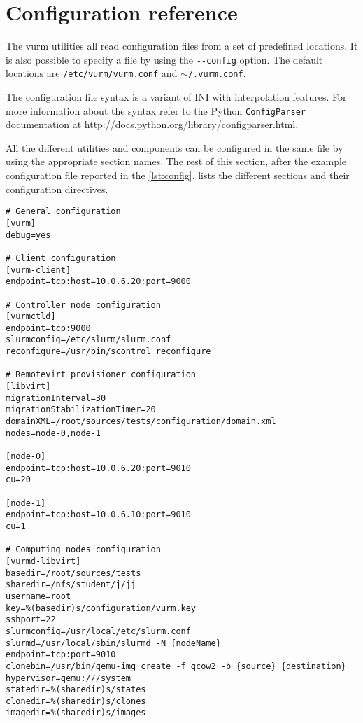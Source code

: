 \section{Configuration reference}

The \gls{vurm} utilities all read configuration files from a set of predefined locations. It is also possible to specify a file by using the \texttt{-\--config} option. The default locations are \texttt{/etc/vurm/vurm.conf} and \texttt{$\sim$/.vurm.conf}.

The configuration file syntax is a variant of INI with interpolation features. For more information about the syntax refer to the Python \texttt{ConfigParser} documentation at \url{http://docs.python.org/library/configparser.html}.

All the different utilities and components can be configured in the same file by using the appropriate section names. The rest of this section, after the example configuration file reported in the \autoref{lst:config}, lists the different sections and their configuration directives.

\begin{lstlisting}
# General configuration
[vurm]
debug=yes

# Client configuration
[vurm-client]
endpoint=tcp:host=10.0.6.20:port=9000

# Controller node configuration
[vurmctld]
endpoint=tcp:9000
slurmconfig=/etc/slurm/slurm.conf
reconfigure=/usr/bin/scontrol reconfigure

# Remotevirt provisioner configuration
[libvirt]
migrationInterval=30
migrationStabilizationTimer=20
domainXML=/root/sources/tests/configuration/domain.xml
nodes=node-0,node-1

[node-0]
endpoint=tcp:host=10.0.6.20:port=9010
cu=20

[node-1]
endpoint=tcp:host=10.0.6.10:port=9010
cu=1

# Computing nodes configuration
[vurmd-libvirt]
basedir=/root/sources/tests
sharedir=/nfs/student/j/jj
username=root
key=%(basedir)s/configuration/vurm.key
sshport=22
slurmconfig=/usr/local/etc/slurm.conf
slurmd=/usr/local/sbin/slurmd -N {nodeName}
endpoint=tcp:port=9010
clonebin=/usr/bin/qemu-img create -f qcow2 -b {source} {destination}
hypervisor=qemu:///system
statedir=%(sharedir)s/states
clonedir=%(sharedir)s/clones
imagedir=%(sharedir)s/images
\end{lstlisting}


